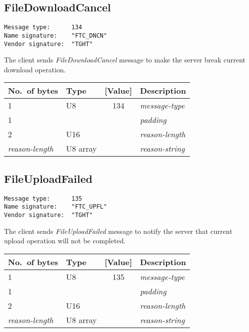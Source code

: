 \documentclass[a4paper]{article}
\newcommand{\typestr}[1]{\textit{#1}}
\begin{document}

\newpage
\subsection{FileDownloadCancel}
\begin{verbatim}
Message type:      134
Name signature:    "FTC_DNCN"
Vendor signature:  "TGHT"
\end{verbatim}

The client sends \typestr{FileDownloadCancel} message to make the
server break current download operation.

\begin{tabular}{l|lc|l} \hline
No.\ of bytes & Type & [Value] & Description \\ \hline
1 & U8  & 134 & \typestr{message-type} \\
1 &     &     & \typestr{padding} \\
2 & U16 &     & \typestr{reason-length} \\
\typestr{reason-length} & U8 array & & \typestr{reason-string} \\
\hline\end{tabular}


\newpage
\subsection{FileUploadFailed}
\begin{verbatim}
Message type:      135
Name signature:    "FTC_UPFL"
Vendor signature:  "TGHT"
\end{verbatim}

The client sends \typestr{FileUploadFailed} message to notify the
server that current upload operation will not be completed.

\begin{tabular}{l|lc|l} \hline
No.\ of bytes & Type & [Value] & Description \\ \hline
1 & U8  & 135 & \typestr{message-type} \\
1 &     &     & \typestr{padding} \\
2 & U16 &     & \typestr{reason-length} \\
\typestr{reason-length} & U8 array & & \typestr{reason-string} \\
\hline\end{tabular}
\end{document}
